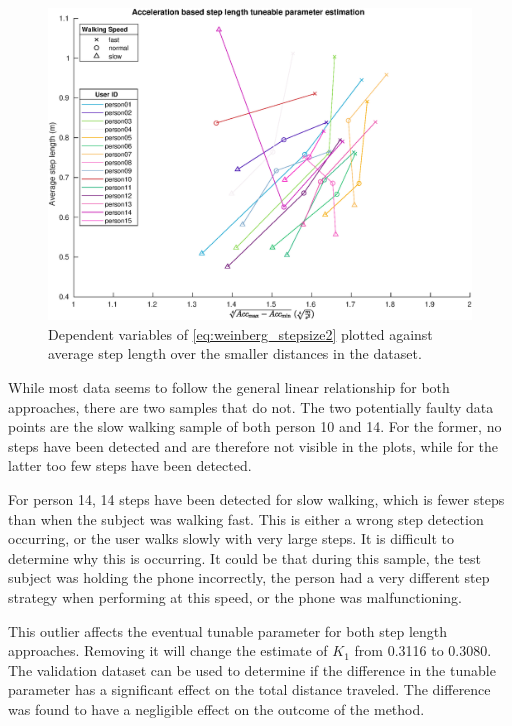 \begin{figure}[h]
	\centering
	\includegraphics[width=0.8\linewidth]{images/20201128_1317_}
	\setlength{\belowcaptionskip}{-10pt}
	\caption{Dependent variables of \eqref{eq:weinberg_stepsize2} plotted against average step length over the smaller distances in the \citet{Vezocnik2019} dataset.}
	\label{fig:step_length_weinberg}
\end{figure}

While most data seems to follow the general linear relationship for both approaches, there are two samples that do not. The two potentially faulty data points are the slow walking sample of both person 10 and 14. For the former, no steps have been detected and are therefore not visible in the plots, while for the latter too few steps have been detected. \par 

For person 14, 14 steps have been detected for slow walking, which is fewer steps than when the subject was walking fast. This is either a wrong step detection occurring, or the user walks slowly with very large steps. It is difficult to determine why this is occurring. It could be that during this sample, the test subject was holding the phone incorrectly, the person had a very different step strategy when performing at this speed, or the phone was malfunctioning. \par 

This outlier affects the eventual tunable parameter for both step length approaches. Removing it will change the estimate of $K_1$ from 0.3116 to 0.3080. The validation dataset can be used to determine if the difference in the tunable parameter has a significant effect on the total distance traveled. The difference was found to have a negligible effect on the outcome of the method.

